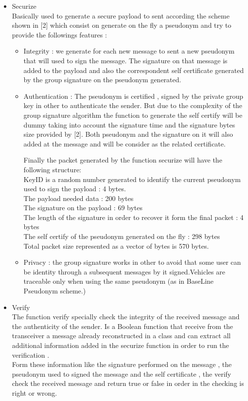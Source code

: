 \begin{itemize}

\item Securize\\
Basically used to generate a secure payload to sent according the scheme shown in [2] which consist on generate on the fly a pseudonym and try to provide the followings features :
\begin{itemize}
\item Integrity : we generate for each new message  to sent a new pseudonym that will used to sign the message. The signature on that message is added to the payload and also the correspondent self certificate generated by the group signature on the pseudonym generated. 
\item Authentication : The pseudonym  is  certified , signed by the private group key in other to authenticate the sender. But due to the complexity of the group signature algorithm the function to generate the self certify will be dummy taking into account the signature time and the signature bytes size provided by [2]. Both pseudonym  and the signature on it will also added at the message and will be consider as the related certificate.

Finally the packet generated by the function securize will have the following structure:\\
    KeyID is a random number generated to identify the current pseudonym used to sign the payload : 4 bytes.\\
    The payload needed data : 200 bytes \\
    The signature on the payload : 69 bytes\\
    The length of the signature in order to recover it form the final packet : 4 bytes\\
    The self certify of the pseudonym generated on the fly : 298 bytes\\
  Total packet size represented as a vector of bytes is 570 bytes.\\
\item Privacy : the group signature works in other to avoid that some user can be identity through a subsequent messages by it signed.Vehicles are traceable only when using the same pseudonym (as in BaseLine Pseudonym scheme.) 
\end{itemize}

\item Verify\\
The function verify specially check the integrity of the received message and the authenticity of the sender.
Is a Boolean function that receive from the transceiver a message already reconstructed in a class and can extract all additional  information added in the securize  function in order to run the verification .\\
Form these information like the signature performed on the message , the pseudonym  used to signed the message and the self certificate , the verify check  the received message and return true or false in order in the checking is right or wrong.
\end{itemize}

